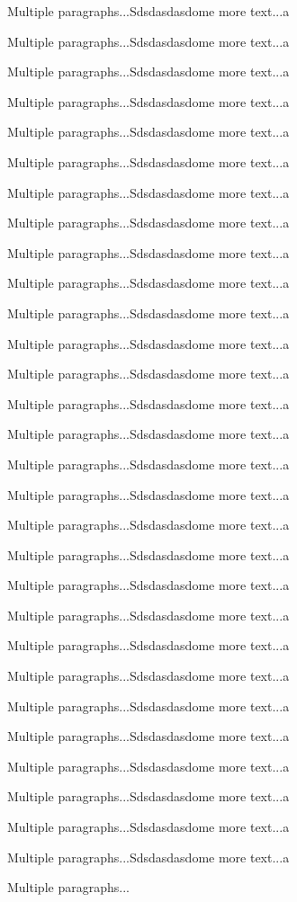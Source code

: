 \documentclass[doublespace,handout,marginnotes]{lingpaper}
\begin{document}
Multiple paragraphs...Sdsdasdasdome more text...a

Multiple paragraphs...Sdsdasdasdome more text...a

Multiple paragraphs...Sdsdasdasdome more text...a

Multiple paragraphs...Sdsdasdasdome more text...a

Multiple paragraphs...Sdsdasdasdome more text...a

Multiple paragraphs...Sdsdasdasdome more text...a

Multiple paragraphs...Sdsdasdasdome more text...a

Multiple paragraphs...Sdsdasdasdome more text...a

Multiple paragraphs...Sdsdasdasdome more text...a

Multiple paragraphs...Sdsdasdasdome more text...a

Multiple paragraphs...Sdsdasdasdome more text...a

Multiple paragraphs...Sdsdasdasdome more text...a

Multiple paragraphs...Sdsdasdasdome more text...a

Multiple paragraphs...Sdsdasdasdome more text...a

Multiple paragraphs...Sdsdasdasdome more text...a

Multiple paragraphs...Sdsdasdasdome more text...a

Multiple paragraphs...Sdsdasdasdome more text...a

Multiple paragraphs...Sdsdasdasdome more text...a

Multiple paragraphs...Sdsdasdasdome more text...a

Multiple paragraphs...Sdsdasdasdome more text...a

Multiple paragraphs...Sdsdasdasdome more text...a

Multiple paragraphs...Sdsdasdasdome more text...a

Multiple paragraphs...Sdsdasdasdome more text...a

Multiple paragraphs...Sdsdasdasdome more text...a

Multiple paragraphs...Sdsdasdasdome more text...a

Multiple paragraphs...Sdsdasdasdome more text...a


Multiple paragraphs...Sdsdasdasdome more text...a

Multiple paragraphs...Sdsdasdasdome more text...a

Multiple paragraphs...Sdsdasdasdome more text...a

Multiple paragraphs...

\end{document}
